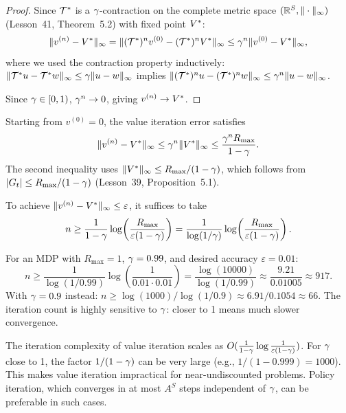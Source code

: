 \documentclass[11pt,a4paper]{article}
\begin{document}
\begin{proof}
Since $\mathcal{T}^*$ is a $\gamma$-contraction on the complete
metric space $(\mathbb{R}^S, \|\cdot\|_\infty)$ (Lesson~41,
Theorem~5.2) with fixed point $V^*$:
\[
    \|v^{(n)} - V^*\|_\infty
    = \|(\mathcal{T}^*)^n v^{(0)} - (\mathcal{T}^*)^n V^*\|_\infty
    \leq \gamma^n \|v^{(0)} - V^*\|_\infty,
\]
where we used the contraction property inductively:
$\|\mathcal{T}^* u - \mathcal{T}^* w\|_\infty \leq
\gamma \|u - w\|_\infty$ implies
$\|(\mathcal{T}^*)^n u - (\mathcal{T}^*)^n w\|_\infty \leq
\gamma^n \|u - w\|_\infty$.

Since $\gamma \in [0,1)$, $\gamma^n \to 0$, giving
$v^{(n)} \to V^*$.
\end{proof}

\begin{keyresult}[title={A Priori Error Bound for Value Iteration}]
\label{kr:apriori}
Starting from $v^{(0)} = 0$, the value iteration error satisfies
\[
    \|v^{(n)} - V^*\|_\infty
    \leq \gamma^n \|V^*\|_\infty
    \leq \frac{\gamma^n R_{\max}}{1 - \gamma}.
\]
The second inequality uses $\|V^*\|_\infty \leq
R_{\max}/(1-\gamma)$, which follows from $|G_t| \leq
R_{\max}/(1-\gamma)$ (Lesson~39, Proposition~5.1).

To achieve $\|v^{(n)} - V^*\|_\infty \leq \varepsilon$, it
suffices to take
\[
    n \geq \frac{1}{1-\gamma}
    \log\!\left(\frac{R_{\max}}{\varepsilon(1-\gamma)}\right)
    = \frac{1}{\log(1/\gamma)}
    \log\!\left(\frac{R_{\max}}{\varepsilon(1-\gamma)}\right).
\]
\end{keyresult}

\begin{example}
\label{ex:iteration-count}
For an MDP with $R_{\max} = 1$, $\gamma = 0.99$, and desired
accuracy $\varepsilon = 0.01$:
\[
    n \geq \frac{1}{\log(1/0.99)}
    \log\!\left(\frac{1}{0.01 \cdot 0.01}\right)
    = \frac{\log(10000)}{\log(1/0.99)}
    \approx \frac{9.21}{0.01005}
    \approx 917.
\]
With $\gamma = 0.9$ instead:
$n \geq \log(1000)/\log(1/0.9) \approx 6.91/0.1054 \approx 66$.
The iteration count is highly sensitive to $\gamma$: closer to 1
means much slower convergence.
\end{example}

\begin{warning}[title={Dependence on $1/(1-\discount)$}]
The iteration complexity of value iteration scales as
$O(\frac{1}{1-\gamma} \log \frac{1}{\varepsilon(1-\gamma)})$.
For $\gamma$ close to 1, the factor $1/(1-\discount)$ can be
very large (e.g., $1/(1-0.999) = 1000$). This makes value
iteration impractical for near-undiscounted problems. Policy
iteration, which converges in at most $A^S$ steps independent of
$\gamma$, can be preferable in such cases.
\end{warning}
\end{document}
